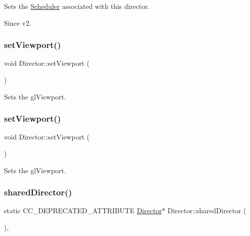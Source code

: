 Sets the \hyperlink{classScheduler}{Scheduler} associated with this director. \begin{DoxySince}{Since}
v2. 
\end{DoxySince}
\mbox{\label{classDirector_aa93aca162b691b52a1ec1d206ca39a64}} 
\subsubsection{\texorpdfstring{set\+Viewport()}{setViewport()}\hspace{0.1cm}{\footnotesize\ttfamily [1/2]}}
{\footnotesize\ttfamily void Director\+::set\+Viewport (\begin{DoxyParamCaption}{ }\end{DoxyParamCaption})}

Sets the gl\+Viewport. \mbox{\label{classDirector_aa93aca162b691b52a1ec1d206ca39a64}} 
\subsubsection{\texorpdfstring{set\+Viewport()}{setViewport()}\hspace{0.1cm}{\footnotesize\ttfamily [2/2]}}
{\footnotesize\ttfamily void Director\+::set\+Viewport (\begin{DoxyParamCaption}{ }\end{DoxyParamCaption})}

Sets the gl\+Viewport. \mbox{\label{classDirector_ade6993ad99aefbbe5643b60749871a39}} 
\subsubsection{\texorpdfstring{shared\+Director()}{sharedDirector()}\hspace{0.1cm}{\footnotesize\ttfamily [1/2]}}
{\footnotesize\ttfamily static C\+C\+\_\+\+D\+E\+P\+R\+E\+C\+A\+T\+E\+D\+\_\+\+A\+T\+T\+R\+I\+B\+U\+TE \hyperlink{classDirector}{Director}$\ast$ Director\+::shared\+Director (\begin{DoxyParamCaption}{ }\end{DoxyParamCaption})\hspace{0.3cm}{\ttfamily [inline]}, {\ttfamily [static]}}

